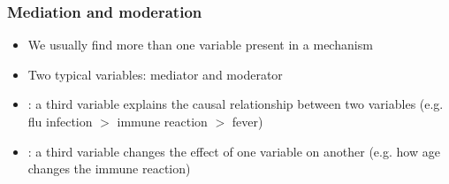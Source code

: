 \begin{frame}
\frametitle{Mediation and moderation}
\centering

\begin{itemize}
\item We usually find more than one variable present in a mechanism
\item Two typical variables: mediator and moderator
\item {}: a third variable explains the causal relationship between two variables (e.g. flu infection $>$ immune reaction $>$ fever)
\item {}: a third variable changes the effect of one variable on another (e.g. how age changes the immune reaction)
\end{itemize}

\end{frame}
\note{}

